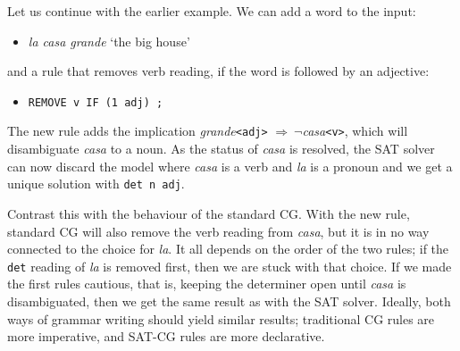 Let us continue with the earlier example. 
We can add a word to the input:
\begin{itemize}
\item [] \emph{la casa grande} `the big house'
\end{itemize}
and a rule that removes verb reading, if the word is followed by an adjective:
\begin{itemize}
\item [] \texttt{REMOVE v IF (1 adj) ;}
\end{itemize}

The new rule adds the implication 
\emph{grande}\texttt{<adj>} $\Rightarrow \ \neg$\emph{casa}\texttt{<v>}, 
which will disambiguate  \emph{casa} to a noun. 
As the status of \emph{casa} is resolved, the SAT solver can now
discard the model where \emph{casa} is a verb and \emph{la} is a
pronoun
and we get a unique solution with \texttt{det n adj}.

Contrast this with the behaviour of the standard CG.
With the new rule, standard CG will also remove the verb reading from \emph{casa}, 
but it is in no way connected to the choice for \emph{la}. It all
depends on the order of the two rules; if the \texttt{det} reading of
\emph{la} is removed first, then we are stuck with that choice.
If we made the first rules cautious, that is, keeping the determiner
open until \emph{casa} is disambiguated, then we get the same
result as with the SAT solver.
Ideally, both ways of grammar writing should yield similar results;
traditional CG rules are more imperative, and SAT-CG
rules are more declarative.




